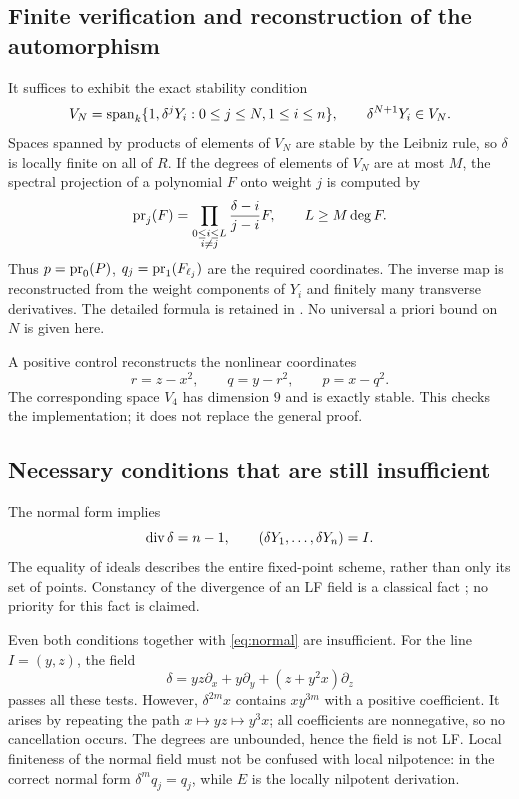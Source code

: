 \subsection{Finite verification and reconstruction of the automorphism}
It suffices to exhibit the exact stability condition
\[
V_N=\operatorname{span}_k\{1,\delta^jY_i:0\le j\le N, 1\le i\le n\},\qquad
\delta^{N+1}Y_i\in V_N.
\]
Spaces spanned by products of elements of $V_N$ are stable by the Leibniz rule,
so $\delta$ is locally finite on all of $R$.
If the degrees of elements of $V_N$ are at most $M$, the spectral
projection of a polynomial $F$ onto weight $j$ is computed by
\[
\operatorname{pr}_j(F)=\prod_{\substack{0\le i\le L\\i\ne j}}
\frac{\delta-i}{j-i}F,\qquad L\ge M\deg F.
\]
Thus
$p=\operatorname{pr}_0(P)$, $q_j=\operatorname{pr}_1(F_{\ell_j})$ are the required coordinates.
The inverse map is reconstructed from the weight components of
$Y_i$ and finitely many transverse derivatives. The detailed formula is retained
in . No universal a priori bound on $N$ is given here.

A positive control reconstructs the nonlinear coordinates
\[
r=z-x^2,\qquad q=y-r^2,\qquad p=x-q^2.
\]
The corresponding space $V_4$ has dimension $9$ and is exactly
stable. This checks the implementation; it does not replace the general proof.

\subsection{Necessary conditions that are still insufficient}
The normal form implies
\[
\operatorname{div}\delta=n-1,\qquad (\delta Y_1,\ldots,\delta Y_n)=I.
\]
The equality of ideals describes the entire fixed-point scheme, rather than
only its set of points. Constancy of the divergence of an LF field is a classical
fact \cite{Nowicki}; no priority for this fact is claimed.

Even both conditions together with \eqref{eq:normal} are insufficient.
For the line $I=(y,z)$, the field
\[
\delta=yz\partial_x+y\partial_y+(z+y^2x)\partial_z
\]
passes all these tests. However, $\delta^{2m}x$ contains
$xy^{3m}$ with a positive coefficient. It arises by repeating
the path $x\mapsto yz\mapsto y^3x$; all coefficients are nonnegative,
so no cancellation occurs. The degrees are unbounded, hence the field is not LF.
Local finiteness of the normal field must not be confused with local
nilpotence: in the correct normal form $\delta^m q_j=q_j$, while $E$
is the locally nilpotent derivation.

